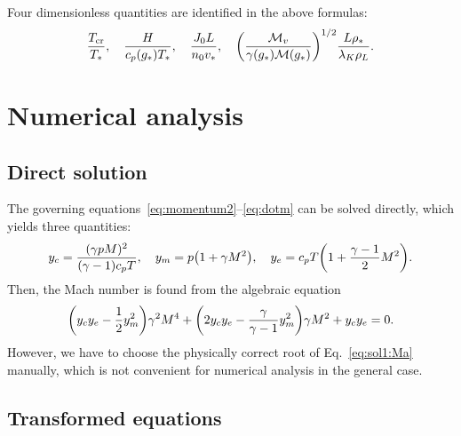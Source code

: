 \documentclass{article}
\newcommand{\crit}[2][]{#2_\text{cr#1}}
\begin{document}
Four dimensionless quantities are identified in the above formulas:
\begin{equation}\label{eq:dimensionless}
    \frac{\crit{T}}{T_*}, \quad \frac{H}{c_p(g_*)T_*}, \quad
    \frac{J_0L}{n_0v_*}, \quad \qty(\frac{\mathcal{M}_v}{\gamma(g_*)\mathcal{M}(g_*)})^{1/2}\frac{L\rho_*}{\lambda_K\rho_L}.
\end{equation}

\section{Numerical analysis}

\subsection{Direct solution}

The governing equations~\eqref{eq:momentum2}--\eqref{eq:dotm} can be solved directly, which yields three quantities:
\begin{equation}\label{eq:sol1:y}
    y_c = \frac{(\gamma pM)^2}{(\gamma-1)c_pT}, \quad
    y_m = p\qty(1 + \gamma M^2), \quad
    y_e = c_pT\qty(1 + \frac{\gamma-1}{2}M^2).
\end{equation}
Then, the Mach number is found from the algebraic equation
\begin{equation}\label{eq:sol1:Ma}
    \qty(y_c y_e - \frac12y_m^2)\gamma^2M^4 + \qty(2y_c y_e - \frac{\gamma}{\gamma-1}y_m^2)\gamma M^2 + y_cy_e = 0.
\end{equation}
However, we have to choose the physically correct root of Eq.~\eqref{eq:sol1:Ma} manually,
which is not convenient for numerical analysis in the general case.

\subsection{Transformed equations}
\end{document}
